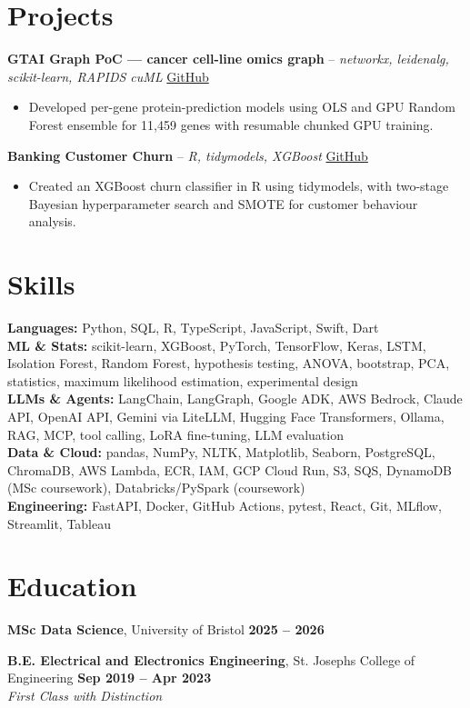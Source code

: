 \documentclass[a4paper,10pt]{article}
\begin{document}
\section{Projects}
\noindent\textbf{GTAI Graph PoC — cancer cell-line omics graph} -- \textit{networkx, leidenalg, scikit-learn, RAPIDS cuML} \hfill \href{https://github.com/Thiruvel-AP/GTAI-GraphPOC}{GitHub}
\begin{itemize}
  \item Developed per-gene protein-prediction models using OLS and GPU Random Forest ensemble for 11,459 genes with resumable chunked GPU training.
\end{itemize}
\noindent\textbf{Banking Customer Churn} -- \textit{R, tidymodels, XGBoost} \hfill \href{https://github.com/Thiruvel-AP/Banking-Customer-Churn-Prediction}{GitHub}
\begin{itemize}
  \item Created an XGBoost churn classifier in R using tidymodels, with two-stage Bayesian hyperparameter search and SMOTE for customer behaviour analysis.
\end{itemize}

\section{Skills}
\textbf{Languages:} Python, SQL, R, TypeScript, JavaScript, Swift, Dart\\
\textbf{ML \& Stats:} scikit-learn, XGBoost, PyTorch, TensorFlow, Keras, LSTM, Isolation Forest, Random Forest, hypothesis testing, ANOVA, bootstrap, PCA, statistics, maximum likelihood estimation, experimental design\\
\textbf{LLMs \& Agents:} LangChain, LangGraph, Google ADK, AWS Bedrock, Claude API, OpenAI API, Gemini via LiteLLM, Hugging Face Transformers, Ollama, RAG, MCP, tool calling, LoRA fine-tuning, LLM evaluation\\
\textbf{Data \& Cloud:} pandas, NumPy, NLTK, Matplotlib, Seaborn, PostgreSQL, ChromaDB, AWS Lambda, ECR, IAM, GCP Cloud Run, S3, SQS, DynamoDB (MSc coursework), Databricks/PySpark (coursework)\\
\textbf{Engineering:} FastAPI, Docker, GitHub Actions, pytest, React, Git, MLflow, Streamlit, Tableau

\section{Education}
\textbf{MSc Data Science}, University of Bristol \hfill \textbf{2025 – 2026}\par
\vspace{2pt}
\textbf{B.E. Electrical and Electronics Engineering}, St. Joseph\textquotesingle{}s College of Engineering \hfill \textbf{Sep 2019 – Apr 2023}\\ \textit{First Class with Distinction}\par
\end{document}
